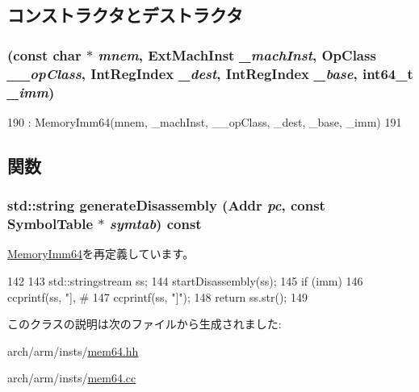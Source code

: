 \subsection{コンストラクタとデストラクタ}
\hypertarget{classArmISA_1_1MemoryPostIndex64_a16d28eb4ba77d718ecd9964631480205}{
\subsubsection[{MemoryPostIndex64}]{ (const char $\ast$ {\em mnem}, \/  {\bf ExtMachInst} {\em \_\-machInst}, \/  OpClass {\em \_\-\_\-opClass}, \/  {\bf IntRegIndex} {\em \_\-dest}, \/  {\bf IntRegIndex} {\em \_\-base}, \/  int64\_\-t {\em \_\-imm})}}
\label{classArmISA_1_1MemoryPostIndex64_a16d28eb4ba77d718ecd9964631480205}



\begin{DoxyCode}
190         : MemoryImm64(mnem, _machInst, __opClass, _dest, _base, _imm)
191     {}
\end{DoxyCode}


\subsection{関数}
\hypertarget{classArmISA_1_1MemoryPostIndex64_a95d323a22a5f07e14d6b4c9385a91896}{
\subsubsection[{generateDisassembly}]{\setlength{\rightskip}{0pt plus 5cm}std::string generateDisassembly ({\bf Addr} {\em pc}, \/  const SymbolTable $\ast$ {\em symtab}) const}}
\label{classArmISA_1_1MemoryPostIndex64_a95d323a22a5f07e14d6b4c9385a91896}


\hyperlink{classArmISA_1_1MemoryImm64_a95d323a22a5f07e14d6b4c9385a91896}{MemoryImm64}を再定義しています。


\begin{DoxyCode}
142 {
143     std::stringstream ss;
144     startDisassembly(ss);
145     if (imm)
146         ccprintf(ss, "], #%
147     ccprintf(ss, "]");
148     return ss.str();
149 }
\end{DoxyCode}


このクラスの説明は次のファイルから生成されました:\begin{DoxyCompactItemize}
\item 
arch/arm/insts/\hyperlink{mem64_8hh}{mem64.hh}\item 
arch/arm/insts/\hyperlink{mem64_8cc}{mem64.cc}\end{DoxyCompactItemize}
